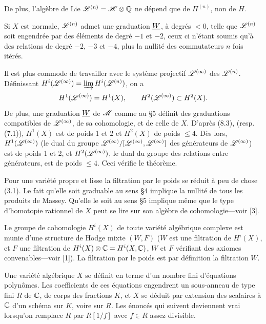 \documentclass[8pt]{extarticle}
\begin{document}
De plus, l'algèbre de Lie \(\mathscr{L}^{(n)}=\mathscr{H}\otimes\mathbb{Q}\) ne dépend que de \(\Pi^{(n)}\), non de \(H\).

 Si \(X\) est normale, \(\mathscr{L}^{(n)}\) admet une graduation \(\underline{W}\), à degrés \(<0\), telle que \(\mathscr{L}^{(n)}\) soit engendrée par des éléments de degré \(-1\) et \(-2\), ceux ci n'étant soumis qu'à des relations de degré \(-2\), \(-3\) et \(-4\), plus la nullité des commutateurs \(n\) fois itérés.\EndTheorem

Il est plus commode de travailler avec le système projectif \(\mathscr{L}^{(\infty)}\) des \(\mathscr{L}^{(n)}\). Définissant \(H^i(\mathscr{L}^{(\infty)})=\varinjlim H^i(\mathscr{L}^{(n)})\), on a
\[
H^1(\mathscr{L}^{(\infty)})=H^1(X),\qquad H^2(\mathscr{L}^{(\infty)})\subset H^2(X).
\]
De plus, une graduation \(\underline{W}\) de \(\mathscr{M}\) comme au §5 définit des graduations compatibles de \(\mathscr{L}^{(\infty)}\), de sa cohomologie, et de celle de \(X\). D'après (8.3), (resp. (7.1)), \(H^1(X)\) est de poids 1 et 2 et \(H^2(X)\) de poids \(\le4\). Dès lors, \(H^1(\mathscr{L}^{(\infty)})\) (le dual du groupe \(\mathscr{L}^{(\infty)}/[\mathscr{L}^{(\infty)},\mathscr{L}^{(\infty)}]\) des générateurs de \(\mathscr{L}^{(\infty)}\)) est de poids 1 et 2, et \(H^2(\mathscr{L}^{(\infty)})\), le dual du groupe des relations entre générateurs, est de poids \(\le4\). Ceci vérifie le théorème.

 Pour une variété propre et lisse la filtration par le poids se réduit à peu de chose (3.1). Le fait qu'elle soit graduable au sens §4 implique la nullité de tous les produits de Massey. Qu'elle le soit au sens §5 implique même que le type d'homotopie rationnel de \(X\) peut se lire sur son algèbre de cohomologie---voir [3].

 Le groupe de cohomologie \(H^i(X)\) de toute variété algébrique complexe est munie d'une structure de Hodge mixte \((W,F)\) (\(W\) est une filtration de \(H^i(X)\), et \(F\) une filtration de \(H^i(X)\otimes\mathbb{C}=H^i(X,\mathbb{C})\), \(W\) et \(F\) vérifiant des axiomes convenables---voir [1]). La filtration par le poids est par définition la filtration \(W\).

 Une variété algébrique \(X\) se définit en terme d'un nombre fini d'équations polynômes. Les coefficients de ces équations engendrent un sous-anneau de type fini \(R\) de \(\mathbb{C}\), de corps des fractions \(K\), et \(X\) se déduit par extension des scalaires à \(\mathbb{C}\) d'un schéma sur \(K\), voire sur \(R\). Les énoncés qui suivent deviennent vrai lorsqu'on remplace \(R\) par \(R[1/f]\) avec \(f\in R\) assez divisible.
\end{document}
